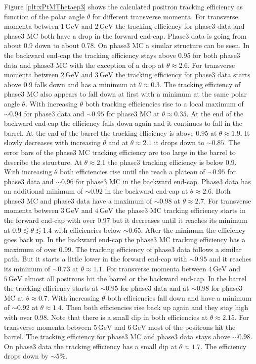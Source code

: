 \documentclass[a4paper,11pt,twosided,final,german,openbib,pdftex,listof=totoc,bibliography=totoc]{scrbook}
\begin{document}
Figure \ref{plt:xPtMThetaep3} shows the calculated positron tracking efficiency as function of the polar angle $\theta$ for different transverse momenta.
For transverse momenta between $1\,\textrm{GeV}$ and $2\,\textrm{GeV}$ the tracking efficiency for phase3 data and phase3 MC both have a drop in the forward end-cap. Phase3 data is going from about 0.9 down to about 0.78. On phase3 MC a similar structure can be seen. In the backward end-cap the tracking efficiency stays above 0.95 for both phase3 data and phase3 MC with the exception of a drop at $\theta \approx 2.6$.
For transverse momenta between $2\,\textrm{GeV}$ and $3\,\textrm{GeV}$ the tracking efficiency for phase3 data starts above 0.9 falls down and has a minimum at $\theta \approx 0.3$. The tracking efficiency of phase3 MC also appears to fall down at first with a minimum at the same polar angle $\theta$. With increasing $\theta$ both tracking efficiencies rise to a local maximum of $\sim 0.94$ for phase3 data and $\sim 0.95$ for phase3 MC at $\theta \approx 0.35$. At the end of the backward end-cap the efficiency falls down again and it continues to fall in the barrel. At the end of the barrel the tracking efficiency is above 0.95 at $\theta \approx 1.9$. It slowly decreases with increasing $\theta$ and at $\theta \approx 2.1$ it drops down to $\sim 0.85$. The error bars of the phase3 MC tracking efficiency are too large in the barrel to describe the structure. At $\theta \approx 2.1$ the phase3 tracking efficiency is below 0.9. With increasing $\theta$ both efficiencies rise until the reach a plateau of $\sim 0.95$ for phase3 data and $\sim 0.96$ for phase3 MC in the backward end-cap. Phase3 data has an additional minimum of $\sim 0.92$ in the backward end-cap at $\theta \approx 2.6$. Both phase3 MC and phase3 data have a maximum of $\sim 0.98$ at $\theta \approx 2.7$.
For transverse momenta between $3\,\textrm{GeV}$ and $4\,\textrm{GeV}$ the phase3 MC tracking efficiency starts in the forward end-cap with over 0.97 but it decreases until it reaches its minimum at $0.9 \lesssim \theta \lesssim 1.4$ with efficiencies below $\sim 0.65$. After the minimum the efficiency goes back up. In the backward end-cap the phase3 MC tracking efficiency has a maximum of over 0.99. The tracking efficiency of phase3 data follows a similar path. But it starts a little lower in the forward end-cap with $\sim 0.95$ and it reaches its minimum of $\sim 0.73$ at $\theta \approx 1.1$.
For transverse momenta between $4\,\textrm{GeV}$ and $5\,\textrm{GeV}$ almost all positrons hit the barrel or the backward end-cap. In the barrel the tracking efficiency starts at $\sim 0.95$ for phase3 data and at $\sim 0.98$ for phase3 MC at $\theta \approx 0.7$. With increasing $\theta$ both efficiencies fall down and have a minimum of $\sim 0.92$ at $\theta \approx 1.4$. Then both efficiencies rise back up again and they stay high with over 0.98. Note that there is a small dip in both efficiencies at $\theta \approx 2.15$.
For transverse momenta between $5\,\textrm{GeV}$ and $6\,\textrm{GeV}$ most of the positrons hit the barrel. The tracking efficiency for phase3 MC and phase3 data stays above $\sim 0.98$. On phase3 data the tracking efficiency has a small dip at $\theta \approx 1.7$. The efficiency drops down by $\sim 5\%$.
\end{document}
